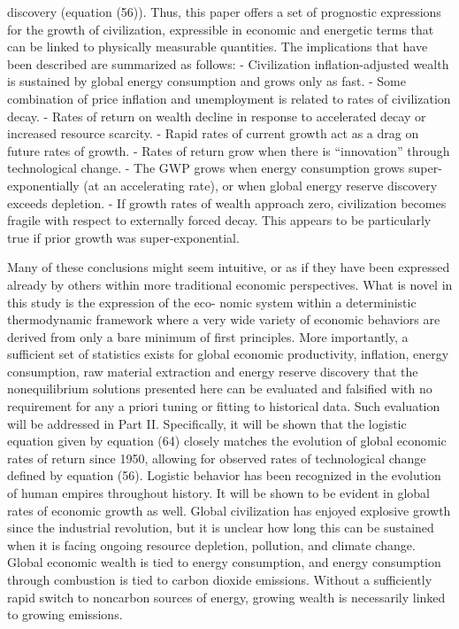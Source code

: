 \documentclass[
]{book}
\begin{document}
discovery (equation (56)).
Thus, this paper oﬀers a set of prognostic expressions for the growth of civilization, expressible in
economic and energetic terms that can be linked to physically measurable quantities. The implications
that have been described are summarized as follows:
- Civilization inﬂation-adjusted wealth is sustained by global energy consumption and grows only as fast.
- Some combination of price inﬂation and unemployment is related to rates of civilization decay.
- Rates of return on wealth decline in response to accelerated decay or increased resource scarcity.
- Rapid rates of current growth act as a drag on future rates of growth.
- Rates of return grow when there is ``innovation'' through technological change.
- The GWP grows when energy consumption grows super-exponentially (at an accelerating rate), or when global energy reserve discovery exceeds depletion.
- If growth rates of wealth approach zero, civilization becomes fragile with respect to externally forced
decay. This appears to be particularly true if prior growth was super-exponential.

Many of these conclusions might seem intuitive, or as if they have been expressed already by others
within more traditional economic perspectives. What is novel in this study is the expression of the eco-
nomic system within a deterministic thermodynamic framework where a very wide variety of economic
behaviors are derived from only a bare minimum of ﬁrst principles.
More importantly, a suﬃcient set of statistics exists for global economic productivity, inﬂation, energy
consumption, raw material extraction and energy reserve discovery that the nonequilibrium solutions
presented here can be evaluated and falsiﬁed with no requirement for any a priori tuning or ﬁtting to
historical data. Such evaluation will be addressed in Part II. Speciﬁcally, it will be shown that the logistic
equation given by equation (64) closely matches the evolution of global economic rates of return since
1950, allowing for observed rates of technological change deﬁned by equation (56). Logistic behavior has
been recognized in the evolution of human empires throughout history. It
will be shown to be evident in global rates of economic growth as well.
Global civilization has enjoyed explosive growth since the industrial revolution, but it is unclear how long
this can be sustained when it is facing ongoing resource depletion, pollution, and climate change. Global
economic wealth is tied to energy consumption, and energy consumption through combustion is tied to
carbon dioxide emissions. Without a suﬃciently rapid switch to noncarbon sources of energy, growing
wealth is necessarily linked to growing emissions.
\end{document}
